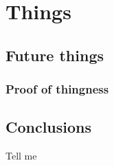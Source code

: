 \chapter{Things}
\section{Future things}
\subsection{Proof of thingness}

\section{Conclusions}
Tell me